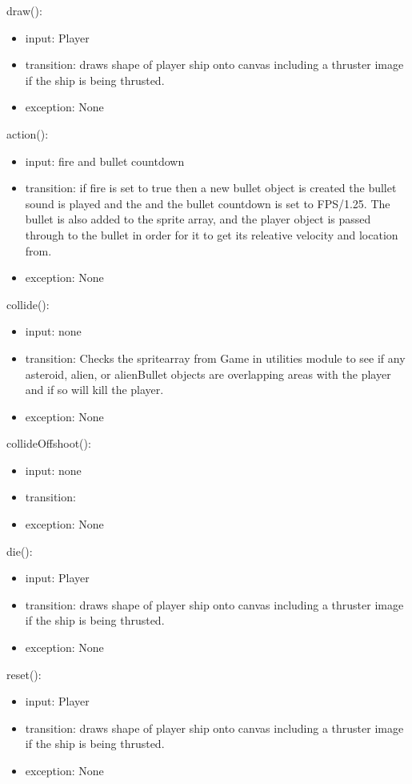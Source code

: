 \documentclass[12pt]{article}
\begin{document}
\noindent draw():
\begin{itemize}
  \item input: Player
  \item transition: draws shape of player ship onto canvas including a thruster image if the ship is being thrusted.
  \item exception: None
\end{itemize}

\noindent action():
\begin{itemize}
  \item input: fire and bullet countdown
  \item transition: if fire is set to true then a new bullet object is created the bullet sound is played and the and the bullet countdown is set to FPS/1.25. The bullet is also added to the sprite array, and the player object is passed through to the bullet in order for it to get its releative velocity and location from.
  \item exception: None
\end{itemize}

\noindent collide():
\begin{itemize}
  \item input: none
  \item transition: Checks the spritearray from Game in utilities module to see if any asteroid, alien, or alienBullet objects are overlapping areas with the player and if so will kill the player.
  \item exception: None
\end{itemize}

\noindent collideOffshoot():
\begin{itemize}
  \item input: none
  \item transition:
  \item exception: None
\end{itemize}

\noindent die():
\begin{itemize}
  \item input: Player
  \item transition: draws shape of player ship onto canvas including a thruster image if the ship is being thrusted.
  \item exception: None
\end{itemize}

\noindent reset():
\begin{itemize}
  \item input: Player
  \item transition: draws shape of player ship onto canvas including a thruster image if the ship is being thrusted.
  \item exception: None
\end{itemize}
\end{document}
